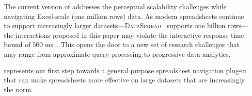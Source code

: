 The current version of \noah addresses the perceptual 
scalability challenges while navigating 
Excel-scale (one million rows) data. 
As modern spreadsheets continue to support 
increasingly larger datasets---{\scshape DataSpread}~\cite{datamodels} 
supports one billion rows---the interactions proposed in this paper may violate the interactive response time bound of 500 ms~\cite{liu2014effects}. This opens the door to a new set of research challenges that may range from approximate query processing to progressive data analytics.

\noah represents our 
first step towards a general purpose spreadsheet navigation plug-in that can make spreadsheets more effective
on large datasets that are increasingly the norm. 
